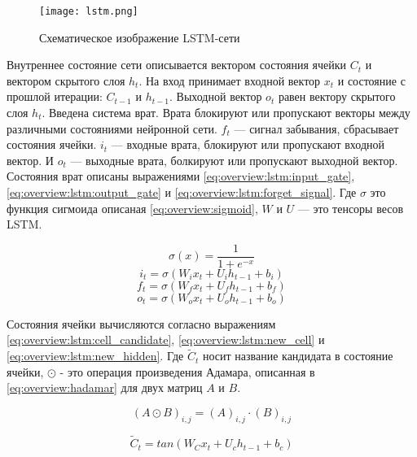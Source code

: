 \begin{figure}[h]
\centering
  \texttt{[image: lstm.png]}
  \caption{Схематическое изображение LSTM-сети}\label{fig:overview:lstm}
\end{figure}

Внутреннее состояние сети описывается вектором состояния ячейки $C_t$ и вектором скрытого слоя $h_t$. На вход принимает входной вектор $x_t$ и состояние с прошлой итерации: $C_{t-1}$ и $h_{t-1}$. Выходной вектор $o_t$ равен вектору скрытого слоя $h_t$. Введена система врат. Врата блокируют или пропускают векторы между различными состояниями нейронной сети. $f_{t}$ --- сигнал забывания, сбрасывает состояния ячейки. $i_{t}$ --- входные врата, блокируют или пропускают входной вектор. И $o_t$ --- выходные врата, болкируют или пропускают выходной вектор. Состояния врат описаны выражениями \ref{eq:overview:lstm:input_gate}, \ref{eq:overview:lstm:output_gate} и \ref{eq:overview:lstm:forget_signal}. Где $\sigma$ это функция сигмоида описаная \ref{eq:overview:sigmoid}, $W$ и $U$ --- это тенсоры весов LSTM.

\begin{equation}
  \label{eq:overview:sigmoid}
  \sigma(x) = \frac{1}{1 + e^{-x}}
\end{equation}
\begin{equation}
  \label{eq:overview:lstm:input_gate}
  i_t = \sigma(W_ix_t + U_ih_{t-1} + b_i)
\end{equation}
\begin{equation}
  \label{eq:overview:lstm:forget_signal}
  f_t = \sigma(W_fx_t + U_fh_{t-1} + b_f)
\end{equation}
\begin{equation}
  \label{eq:overview:lstm:output_gate}
  o_t = \sigma(W_ox_t + U_oh_{t-1} + b_o)
\end{equation}

Состояния ячейки вычисляются согласно выражениям \ref{eq:overview:lstm:cell_candidate}, \ref{eq:overview:lstm:new_cell} и \ref{eq:overview:lstm:new_hidden}. Где $\tilde{C}_t$ носит название кандидата в состояние ячейки, ${\odot}$ - это операция произведения Адамара, описанная в \ref{eq:overview:hadamar} для двух матриц $A$ и $B$.

\begin{equation}
  \label{eq:overview:hadamar}
  (A{\odot}B)_{i,j} = (A)_{i,j}\cdot(B)_{i,j}
\end{equation}

\begin{equation}
  \label{eq:overview:lstm:cell_candidate}
  \tilde{C}_t = tan(W_Cx_t + U_ch_{t-1} + b_c)
\end{equation}

